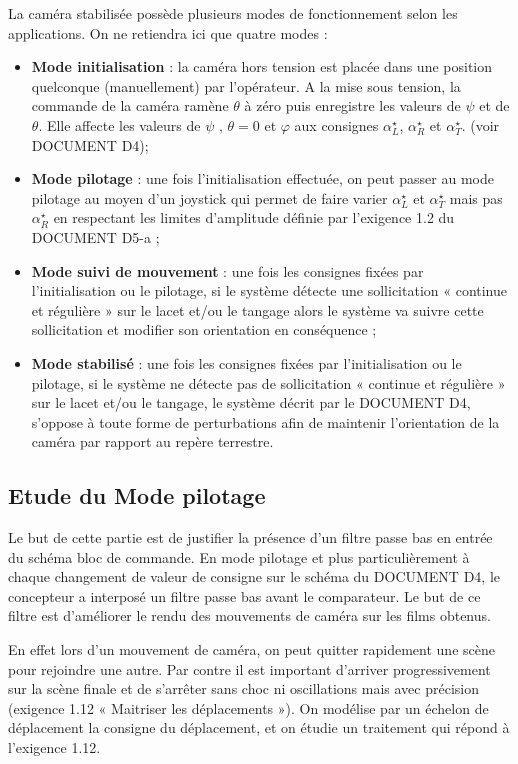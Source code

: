 \documentclass[10pt,fleqn]{article} %
\begin{document}
La caméra stabilisée possède plusieurs modes de fonctionnement selon les applications. On ne retiendra ici que quatre modes :
\begin{itemize}
\item \textbf{Mode initialisation} : la caméra hors tension est placée dans une position quelconque (manuellement) par l’opérateur. A la mise sous tension, la commande de la caméra ramène $\theta$ à zéro puis enregistre les valeurs de $\psi$ et de $\theta$. Elle affecte les valeurs de $\psi$ , $\theta=0$ et $\varphi$ aux consignes $\alpha_L^{\star}$, $\alpha_R^{\star}$ et $\alpha_T^{\star}$. (voir DOCUMENT D4);
\item \textbf{Mode pilotage} : une fois l’initialisation effectuée, on peut passer au mode pilotage au moyen d’un joystick 
qui permet de faire varier  $\alpha_L^{\star}$ et  $\alpha_T^{\star}$
mais pas $\alpha_R^{\star}$ en respectant 
les limites d’amplitude définie par l’exigence 1.2 du DOCUMENT D5-a ;
\item \textbf{Mode suivi de mouvement} : une fois les consignes fixées par l’initialisation ou le pilotage, si le système détecte une sollicitation « continue et régulière » sur le lacet et/ou le tangage alors le système va suivre cette sollicitation et modifier son orientation en conséquence ;
\item \textbf{Mode stabilisé} : une fois les consignes fixées par l’initialisation ou le pilotage, si le système ne détecte pas de sollicitation « continue et régulière » sur le lacet et/ou le tangage, le système décrit par le DOCUMENT D4, s’oppose à toute forme de perturbations afin de maintenir l’orientation de la caméra par rapport au repère terrestre.  
\end{itemize}

\subsection{Etude du Mode pilotage}

Le but de cette partie est de justifier la présence d’un filtre passe bas en entrée du schéma bloc de commande.
En mode pilotage et plus particulièrement à chaque changement de valeur de consigne sur le schéma du DOCUMENT D4, le concepteur a interposé un filtre passe bas avant le comparateur. Le but de ce filtre est d’améliorer le rendu des mouvements de caméra sur les films obtenus.

En effet lors d’un mouvement de caméra, on peut quitter rapidement une scène pour rejoindre une autre. Par contre il est important d’arriver progressivement sur la scène finale et de s’arrêter sans choc ni oscillations mais avec précision (exigence 1.12 « Maitriser les déplacements »).
On modélise par un échelon de déplacement la consigne du déplacement, et on étudie un traitement qui répond à l’exigence 1.12. 
\end{document}
